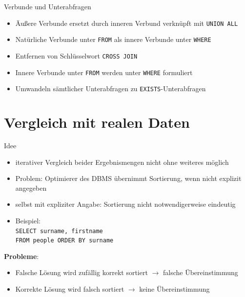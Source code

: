 \documentclass{beamer}
\begin{document}
\begin{frame}[fragile]{Verbunde und Unterabfragen}
\begin{itemize}
\item Äußere Verbunde ersetzt durch inneren Verbund verknüpft mit \verb|UNION ALL|
\item Natürliche Verbunde unter \verb|FROM| als innere Verbunde unter \verb|WHERE|
\item Entfernen von Schlüsselwort \verb|CROSS JOIN|
\item Innere Verbunde unter \verb|FROM| werden unter \verb|WHERE| formuliert
\item Umwandeln sämtlicher Unterabfragen zu \verb|EXISTS|-Unterabfragen 
\end{itemize}
\end{frame}

\section{Vergleich mit realen Daten}



\begin{frame}[fragile]{Idee}
\begin{itemize}
\item iterativer Vergleich beider Ergebnismengen nicht ohne weiteres möglich
\item Problem: Optimierer des DBMS übernimmt Sortierung, wenn nicht explizit angegeben
\item selbst mit expliziter Angabe: Sortierung nicht notwendigerweise eindeutig
\item Beispiel: \\\verb|SELECT surname, firstname|\\\verb|FROM people ORDER BY surname|
\end{itemize}
\textbf{Probleme}:\\
\begin{itemize}
\item Falsche Lösung wird zufällig korrekt sortiert $\to$ falsche Übereinstimmung
\item Korrekte Lösung wird falsch sortiert $\to$ keine Übereinstimmung 
\end{itemize}
\end{frame}
\end{document}
